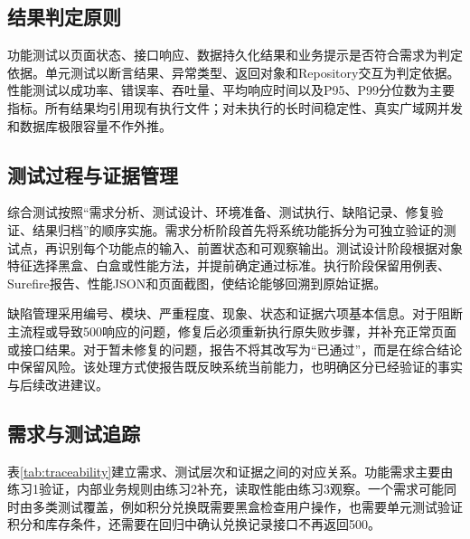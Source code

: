 \documentclass[bwprint]{report}
\begin{document}
\subsection{结果判定原则}
功能测试以页面状态、接口响应、数据持久化结果和业务提示是否符合需求为判定依据。单元测试以断言结果、异常类型、返回对象和Repository交互为判定依据。性能测试以成功率、错误率、吞吐量、平均响应时间以及P95、P99分位数为主要指标。所有结果均引用现有执行文件；对未执行的长时间稳定性、真实广域网并发和数据库极限容量不作外推。

\subsection{测试过程与证据管理}
综合测试按照“需求分析、测试设计、环境准备、测试执行、缺陷记录、修复验证、结果归档”的顺序实施。需求分析阶段首先将系统功能拆分为可独立验证的测试点，再识别每个功能点的输入、前置状态和可观察输出。测试设计阶段根据对象特征选择黑盒、白盒或性能方法，并提前确定通过标准。执行阶段保留用例表、Surefire报告、性能JSON和页面截图，使结论能够回溯到原始证据。

缺陷管理采用编号、模块、严重程度、现象、状态和证据六项基本信息。对于阻断主流程或导致500响应的问题，修复后必须重新执行原失败步骤，并补充正常页面或接口结果。对于暂未修复的问题，报告不将其改写为“已通过”，而是在综合结论中保留风险。该处理方式使报告既反映系统当前能力，也明确区分已经验证的事实与后续改进建议。

\subsection{需求与测试追踪}
表\ref{tab:traceability}建立需求、测试层次和证据之间的对应关系。功能需求主要由练习1验证，内部业务规则由练习2补充，读取性能由练习3观察。一个需求可能同时由多类测试覆盖，例如积分兑换既需要黑盒检查用户操作，也需要单元测试验证积分和库存条件，还需要在回归中确认兑换记录接口不再返回500。
\end{document}

